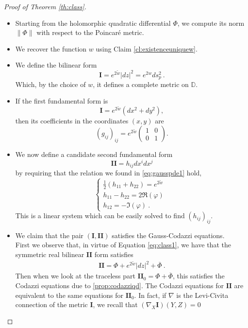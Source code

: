 \documentclass[a4paper,11pt,openright,twoside]{book}
\newcommand{\I}{\mathbf{I}}
\newcommand{\II}{\mathbf{I\!I}}
\newcommand{\1}{\mathds{1}}
\newcommand{\astr}[1]{\textsf{{(${*}$#1)}}}
\theoremstyle{plain}
\theoremstyle{definition}
\theoremstyle{remark}
\begin{document}
\begin{proof}[Proof of Theorem \ref{th:class}]
\begin{enumerate}[noitemsep,leftmargin=*,label=\textbf{\arabic*.}]
\begin{itemize}[noitemsep]
	\item[\astr{1}] Starting from the holomorphic quadratic differential $\Phi$, we compute its norm $\|\Phi\|$ with respect to the Poincaré metric.
	\item[\astr{2}] We recover the function $w$ using Claim \ref{cl:existenceuniquew}.
	\item[\astr{3}] We define the bilinear form
	\[
		\I=e^{2\tilde w}|dz|^2 = e^{2w}ds_p^2\ .
	\]
	Which, by the choice of $w$, it defines a complete metric on $\mathbb{D}$. 
	\item[\astr{4}] If the first fundamental form is
	\[
	\I=e^{2\tilde w}(dx^2+dy^2),
	\]
	then its coefficients in the coordinates $(x,y)$ are
	\[
	(g_{ij})_{ij}=e^{2\tilde w}
	\begin{pmatrix}
	1&0\\
	0&1
	\end{pmatrix}.
	\]
	\item[\astr{5}] We now define a candidate second fundamental form
	\[
	\II = h_{ij}dx^i dx^j
	\]
	by requiring that the relation we found in  \eqref{eq:gausspde1} hold,
	\begin{equation}\label{eq:class1}
		\begin{cases}
		\frac{1}{2}(h_{11}+h_{22})= e^{2\tilde w}\\
		h_{11}-h_{22} = 2\Re(\varphi)\\
		h_{12} = -\Im(\varphi)\ .
		\end{cases}
	\ \ 
	\end{equation}
	 This is a linear system which can be easily solved to find $(h_{ij})_{ij}$.
	\item[\astr{6}] We claim that the pair $(\I,\II)$ satisfies the Gauss-Codazzi equations.\\
	
	First we observe that, in virtue of Equation \eqref{eq:class1}, we have that the symmetric real bilinear $\II$ form satisfies
	\begin{align*}
		\II = \Phi + e^{2\tilde w}|dz|^2  +\overline{\Phi}
	\ . 
	\end{align*}
	Then when we look at the traceless part $\II_0 = \Phi + \overline{\Phi}$, this satisfies the Codazzi equations due to \ref{prop:codazziqd}. The Codazzi equations for $\II$ are equivalent to the same equations for $\II_0$. In fact, if $\nabla$ is the Levi-Civita connection of the metric $\I$, we recall that $(\nabla_X\I)(Y,Z) = 0$


\end{itemize}
\end{enumerate}
\end{proof}
\end{document}
